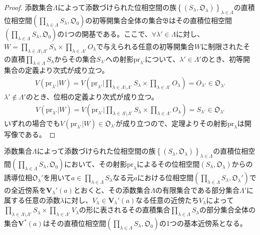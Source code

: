 \documentclass[dvipdfmx]{jsarticle}
\begin{document}
\begin{proof}
添数集合$\varLambda$によって添数づけられた位相空間の族$\left\{ \left( S_{\lambda},\mathfrak{O}_{\lambda} \right) \right\}_{\lambda \in \varLambda}$の直積位相空間$\left( \prod_{\lambda \in \varLambda} S_{\lambda},\mathfrak{O}_{0} \right)$の初等開集合全体の集合$\mathfrak{B}$はその直積位相空間$\left( \prod_{\lambda \in \varLambda} S_{\lambda},\mathfrak{O}_{0} \right)$の1つの開基である。ここで、$\forall\lambda' \in \varLambda$に対し、$W = \prod_{\lambda \in \varLambda \setminus \varLambda'} S_{\lambda} \times \prod_{\lambda \in \varLambda'} O_{\lambda}$で与えられる任意の初等開集合$W$に制限されたその直積$\prod_{\lambda \in \varLambda} S_{\lambda}$からその集合$S_{\lambda'}$への射影${\mathrm{pr}}_{\lambda'}$について、$\lambda' \in \varLambda'$のとき、初等開集合の定義より次式が成り立つ。
\begin{align*}
V\left( {\mathrm{pr}}_{\lambda'}|W \right) = V\left( {\mathrm{pr}}_{\lambda'}|\prod_{\lambda \in \varLambda \setminus \varLambda'} S_{\lambda} \times \prod_{\lambda \in \varLambda'} O_{\lambda} \right) = O_{\lambda'} \in \mathfrak{O}_{\lambda'}
\end{align*}
$\lambda' \notin \varLambda'$のとき、位相の定義より次式が成り立つ。
\begin{align*}
V\left( {\mathrm{pr}}_{\lambda'}|W \right) = V\left( {\mathrm{pr}}_{\lambda'}|\prod_{\lambda \in \varLambda \setminus \varLambda'} S_{\lambda} \times \prod_{\lambda \in \varLambda'} O_{\lambda} \right) = S_{\lambda'} \in \mathfrak{O}_{\lambda'}
\end{align*}
いずれの場合でも$V\left( {\mathrm{pr}}_{\lambda'}|W \right) \in \mathfrak{O}_{\lambda'}$が成り立つので、定理よりその射影${\mathrm{pr}}_{\lambda}$は開写像である。
\end{proof}
\begin{thm}\label{8.1.4.18}
添数集合$\varLambda$によって添数づけられた位相空間の族$\left\{ \left( S_{\lambda},\mathfrak{O}_{\lambda} \right) \right\}_{\lambda \in \varLambda}$の直積位相空間$\left( \prod_{\lambda \in \varLambda} S_{\lambda},\mathfrak{O}_{0} \right)$において、その射影${\mathrm{pr}}_{\lambda}$によるその位相空間$\left( S_{\lambda},\mathfrak{O}_{\lambda} \right)$からの誘導位相$\mathfrak{O}_{\lambda}'$を用いて$a \in \prod_{\lambda \in \varLambda} S_{\lambda}$なる元$a$における位相空間$\left( \prod_{\lambda \in \varLambda} S_{\lambda},\mathfrak{O}_{\lambda}' \right)$での全近傍系を$\mathbf{V}_{\lambda}'(a)$とおくと、その添数集合$\varLambda$の有限集合である部分集合$\varLambda'$に属する任意の添数$\lambda$に対し、$V_{\lambda} \in \mathbf{V}_{\lambda}'(a)$なる任意の近傍たち$V_{\lambda}$によって$\prod_{\lambda \in \varLambda \setminus \varLambda'} S_{\lambda} \times \prod_{\lambda \in \varLambda'} V_{\lambda}$の形に表されるその直積集合$\prod_{\lambda \in \varLambda} S_{\lambda}$の部分集合全体の集合$\mathbf{V}^{*}(a)$はその直積位相空間$\left( \prod_{\lambda \in \varLambda} S_{\lambda},\mathfrak{O}_{0} \right)$の1つの基本近傍系となる。
\end{thm}
\end{document}
